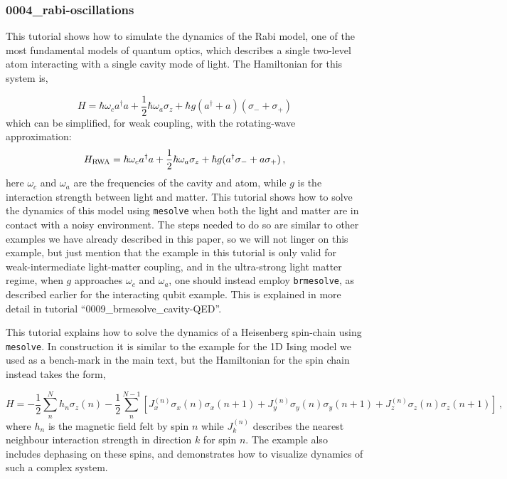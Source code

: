 \documentclass[preprint,3p,sort&compress]{elsarticle}
\def\code#1{\texttt{#1}}
\newcommand{\nocontentsline}[3]{}
\newcommand{\tocless}[2]{\bgroup\let\addcontentsline=\nocontentsline#1{#2}\egroup}
\begin{document}
 \tocless\subsubsection{0004\_rabi-oscillations}


This tutorial shows how to simulate the dynamics of the Rabi model, one of the most fundamental models of quantum optics, which describes a single two-level atom interacting with a single cavity mode of light. The Hamiltonian for this system is,

\begin{equation}
H = \hbar \omega_c a^\dagger a + \frac{1}{2}\hbar\omega_a\sigma_z + \hbar g(a^\dagger + a)(\sigma_- + \sigma_+)
\end{equation}
which can be simplified, for weak coupling, with the rotating-wave approximation:
\begin{equation}
H_{\rm RWA} = \hbar \omega_c a^\dagger a + \frac{1}{2}\hbar\omega_a\sigma_z + \hbar g(a^\dagger\sigma_- + a\sigma_+) \, ,
\end{equation}
here $\omega_c$ and $\omega_a$ are the frequencies of the cavity and atom, while $g$ is the interaction strength between light and matter. This tutorial shows how to solve the dynamics of this model using \code{mesolve} when both the light and matter are in contact with a noisy environment.  The steps needed to do so are similar to other examples we have already described in this paper, so we will not linger on this example, but just mention that the example in this tutorial is only valid for weak-intermediate light-matter coupling, and in the ultra-strong light matter regime, when $g$ approaches $\omega_c$ and $\omega_a$, one should instead employ \code{brmesolve}, as described earlier for the interacting qubit example. This is explained in more detail in tutorial ``0009\_brmesolve\_cavity-QED''.\newline


\tocless\subsubsection{0005\_spin-chain}

This tutorial explains how to solve the dynamics of a Heisenberg spin-chain using \code{mesolve}. In construction it is similar to the example for the 1D Ising model we used as a bench-mark in the main text, but the Hamiltonian for the spin chain instead takes the form,


\begin{equation}
H = - \frac{1}{2}\sum_n^N h_n \sigma_z(n) - \frac{1}{2} \sum_n^{N-1} [ J_x^{(n)} \sigma_x(n) \sigma_x(n+1) + J_y^{(n)} \sigma_y(n) \sigma_y(n+1) +J_z^{(n)} \sigma_z(n) \sigma_z(n+1)] \, ,
\end{equation}
where $h_n$ is the magnetic field felt by spin $n$ while $J_k^{(n)}$ describes the nearest neighbour interaction strength in direction $k$ for spin $n$.  The example also includes dephasing on these spins, and demonstrates how to visualize dynamics of such a complex system.\newline
\end{document}
